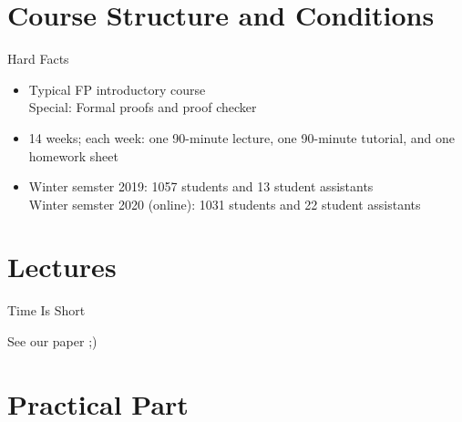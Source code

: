 \documentclass{beamer}
\begin{document}
\section{Course Structure and Conditions}
\begin{frame}{Hard Facts}
\begin{itemize}[<+->]
  \item Typical FP introductory course\\
    Special: Formal proofs and proof checker
  \item 14 weeks; each week: one 90-minute lecture, one 90-minute tutorial, and one homework sheet
   \item Winter semster 2019: 1057 students and 13 student assistants\\
     Winter semster 2020 (online): 1031 students and 22 student assistants
\end{itemize}
\end{frame}


\section{Lectures}
\begin{frame}{Time Is Short}
  \centerline{\alert{\Large{See our paper ;)}}}
\end{frame}


\section{Practical Part}
\end{document}
